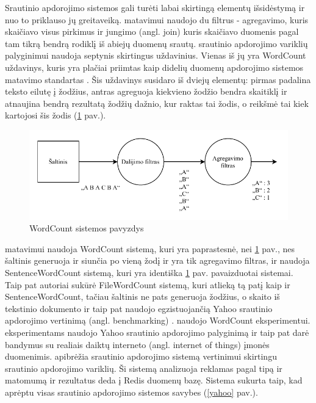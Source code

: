 \documentclass{VUMIFPSbakalaurinis}
\begin{document}
Srautinio apdorojimo sistemos gali turėti labai skirtingą elementų išsidėstymą ir nuo to priklauso jų greitaveiką. \cite{Karimov2018BenchmarkingDS} matavimui naudojo du filtrus - agregavimo, kuris skaičiavo visus pirkimus ir jungimo (angl. join) kuris skaičiavo duomenis pagal tam tikrą bendrą rodiklį iš abiejų duomenų srautų. \cite{Qian2016Benchmarking} srautinio apdorojimo variklių palyginimui naudoja septynis skirtingus uždavinius. Vienas iš jų yra WordCount uždavinys, kuris yra plačiai priimtas kaip didelių duomenų apdorojimo sistemos matavimo standartas \cite{huang2010hibench}. Šis uždavinys susidaro iš dviejų elementų: pirmas padalina teksto eilutę į žodžius, antras agreguoja kiekvieno žodžio bendra skaitiklį ir atnaujina bendrą rezultatą žodžių dažnio, kur raktas tai žodis, o reikšmė tai kiek kartojosi šis žodis (\ref{wordcount} pav.). 
\begin{figure}[H]
    \includegraphics[width=15cm]{img/wordcount.pdf}
    \caption{WordCount sistemos pavyzdys}
    \label{wordcount}
\end{figure} 
\cite{zhang2020heron}  matavimui naudoja WordCount sistemą, kuri yra paprastesnė, nei \ref{wordcount} pav., nes šaltinis generuoja ir siunčia po vieną žodį ir yra tik agregavimo filtras, ir naudoja SentenceWordCount sistemą, kuri yra identiška \ref{wordcount} pav. pavaizduotai sistemai. Taip pat autoriai sukūrė FileWordCount sistemą, kuri atlieką tą patį kaip ir SentenceWordCount, tačiau šaltinis ne pats generuoja žodžius, o skaito iš tekstinio dokumento ir taip pat naudojo egzistuojančią Yahoo srautinio apdorojimo vertinimą (angl. benchmarking) \cite{Chintapalli2016Benchmarking}. \cite{dhalion} naudojo WordCount eksperimentui. \cite{vaquero2018autotuning} eksperimentams naudojo Yahoo srautinio apdorojimo palyginimą \cite{Chintapalli2016Benchmarking} ir taip pat darė bandymus su realiais daiktų interneto (angl. internet of things) įmonės duomenimis. \cite{Chintapalli2016Benchmarking} apibrėžia srautinio apdorojimo sistemą vertinimui skirtingu srautinio apdorojimo variklių. Ši sistemą analizuoja reklamas pagal tipą ir matomumą ir rezultatus deda į Redis duomenų bazę. Sistema sukurta taip, kad aprėptu visas srautinio apdorojimo sistemos savybes (\ref{yahoo} pav.).
\end{document}
